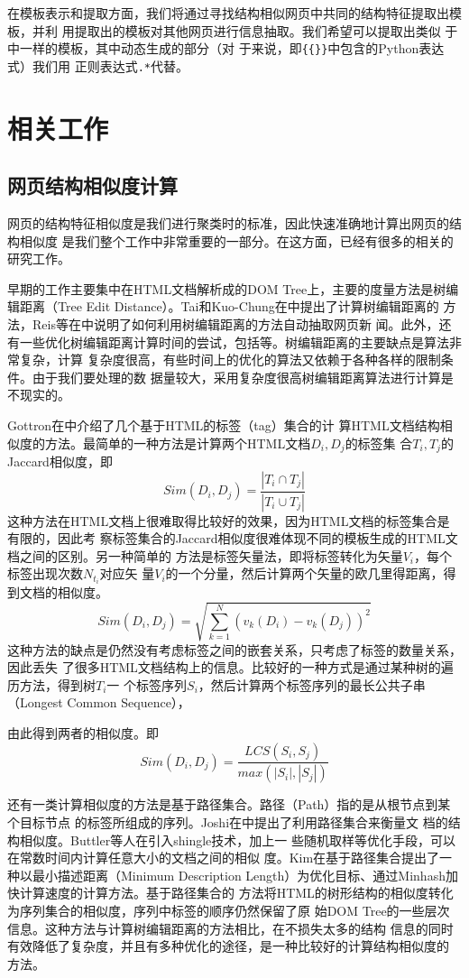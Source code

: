 在模板表示和提取方面，我们将通过寻找结构相似网页中共同的结构特征提取出模板，并利
用提取出的模板对其他网页进行信息抽取。我们希望可以提取出类似
于中一样的模板，其中动态生成的部分（对
于来说，即\texttt{\{\{\}\}}中包含的Python表达式）我们用
正则表达式\texttt{.*}代替。
\section{相关工作}
\label{sec:relatedwork}

\subsection{网页结构相似度计算}
\label{sec:relatedwork:sim}
网页的结构特征相似度是我们进行聚类时的标准，因此快速准确地计算出网页的结构相似度
是我们整个工作中非常重要的一部分。在这方面，已经有很多的相关的研究工作。

早期的工作主要集中在HTML文档解析成的DOM Tree上，主要的度量方法是树编辑距离（Tree
Edit Distance）。Tai和Kuo-Chung在中提出了计算树编辑距离的
方法，Reis等在中说明了如何利用树编辑距离的方法自动抽取网页新
闻。此外，还有一些优化树编辑距离计算时间的尝试，包括等。树编辑距离的主要缺点是算法非常复杂，计算
复杂度很高，有些时间上的优化的算法又依赖于各种各样的限制条件。由于我们要处理的数
据量较大，采用复杂度很高树编辑距离算法进行计算是不现实的。

Gottron在中介绍了几个基于HTML的标签（tag）集合的计
算HTML文档结构相似度的方法。最简单的一种方法是计算两个HTML文档$D_i,D_{j}$的标签集
合$T_i, T_j$的Jaccard相似度，即
\[
Sim(D_i,D_j)=\frac{|T_i \cap T_j|}{|T_i \cup T_j|}
\]
这种方法在HTML文档上很难取得比较好的效果，因为HTML文档的标签集合是有限的，因此考
察标签集合的Jaccard相似度很难体现不同的模板生成的HTML文档之间的区别。另一种简单的
方法是标签矢量法，即将标签转化为矢量$V_i$，每个标签出现次数$N_{t_i}$对应矢
量$V_i$的一个分量，然后计算两个矢量的欧几里得距离，得到文档的相似度。
\[
Sim(D_i,D_j)=\sqrt{\sum_{k=1}^N(v_k(D_i)-v_k(D_j))^2}
\]
这种方法的缺点是仍然没有考虑标签之间的嵌套关系，只考虑了标签的数量关系，因此丢失
了很多HTML文档结构上的信息。比较好的一种方式是通过某种树的遍历方法，得到树$T_i$一
个标签序列$S_i$，然后计算两个标签序列的最长公共子串（Longest Common Sequence），

由此得到两者的相似度。即
\[
Sim(D_i,D_j)=\frac{LCS(S_i,S_j)}{max(|S_i|,|S_j|)}
\]

还有一类计算相似度的方法是基于路径集合。路径（Path）指的是从根节点到某个目标节点
的标签所组成的序列。Joshi在中提出了利用路径集合来衡量文
档的结构相似度。Buttler等人在引入shingle技术，加上一
些随机取样等优化手段，可以在常数时间内计算任意大小的文档之间的相似
度。Kim在基于路径集合提出了一种以最小描述距离（Minimum
Description Length）为优化目标、通过Minhash加快计算速度的计算方法。基于路径集合的
方法将HTML的树形结构的相似度转化为序列集合的相似度，序列中标签的顺序仍然保留了原
始DOM Tree的一些层次信息。这种方法与计算树编辑距离的方法相比，在不损失太多的结构
信息的同时有效降低了复杂度，并且有多种优化的途径，是一种比较好的计算结构相似度的
方法。

